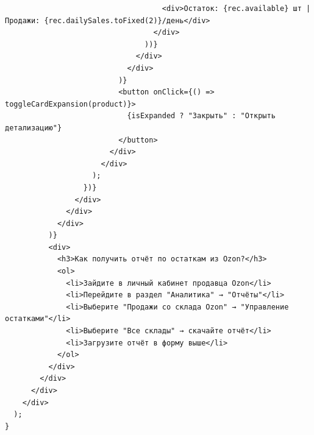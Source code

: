 \begin{code}
\begin{verbatim}
                                    <div>Остаток: {rec.available} шт | Продажи: {rec.dailySales.toFixed(2)}/день</div>
                                  </div>
                                ))}
                              </div>
                            </div>
                          )}
                          <button onClick={() => toggleCardExpansion(product)}>
                            {isExpanded ? "Закрыть" : "Открыть детализацию"}
                          </button>
                        </div>
                      </div>
                    );
                  })}
                </div>
              </div>
            </div>
          )}
          <div>
            <h3>Как получить отчёт по остаткам из Ozon?</h3>
            <ol>
              <li>Зайдите в личный кабинет продавца Ozon</li>
              <li>Перейдите в раздел "Аналитика" → "Отчёты"</li>
              <li>Выберите "Продажи со склада Ozon" → "Управление остатками"</li>
              <li>Выберите "Все склады" → скачайте отчёт</li>
              <li>Загрузите отчёт в форму выше</li>
            </ol>
          </div>
        </div>
      </div>
    </div>
  );
}
\end{verbatim}
\end{code}

